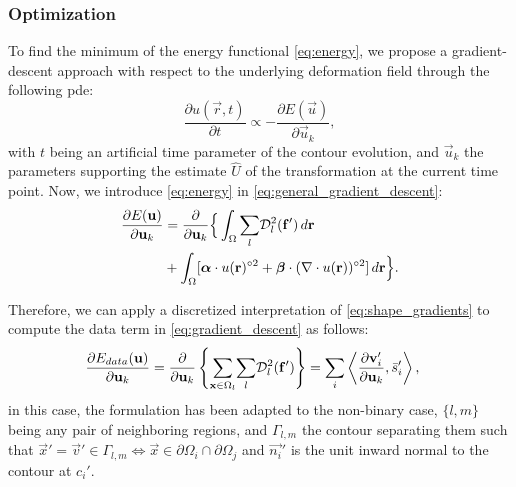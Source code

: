 \subsubsection{Optimization}
\label{sec:gradient_descent}
To find the minimum of the energy functional \eqref{eq:energy},
  we propose a gradient-descent approach with respect to the underlying
  deformation field through the following \gls*{pde}:
  \begin{equation}
  \frac{\partial u(\vec{r},t)}{\partial t} \propto - \frac{\partial E(\vec{u})}{\partial \vec{u}_k},
  \label{eq:general_gradient_descent}
  \end{equation}
  with $t$ being an artificial time parameter of the contour
  evolution, and $\vec{u}_k$ the parameters supporting the estimate
  $\hat{U}$ of the transformation at the current time point.
Now, we introduce \eqref{eq:energy} in \eqref{eq:general_gradient_descent}:
  \begin{align}
  \frac{\partial E(\vec{u})}{\partial \vec{u}_k} &=
  \frac{ \partial }{\partial \vec{u}_k} \Big\{
  \int_{\Omega} \underset{l}{\sum} \mdist{f'}{l} \,d\vec{r} \notag\\
  &+ \int_{\Omega} [ \boldsymbol{\alpha} \cdot u(\vec{r})^{\circ2}
  + \boldsymbol{\beta} \cdot (\nabla \cdot u(\vec{r}))^{\circ2} ] \,d\vec{r}
  \Big\}.
  \label{eq:gradient_descent}
  \end{align}

Therefore, we can apply a discretized interpretation of \eqref{eq:shape_gradients}
  to compute the data term in \eqref{eq:gradient_descent} as follows:
  \begin{align}
  \frac{\partial E_{data}(\vec{u})}{\partial \vec{u}_k} &=
  \frac{ \partial }{\partial \vec{u}_k} \left\{
   \underset{\vec{x} \in \Omega_l}{\sum} \underset{l}{\sum} \mdist{f'}{l} \right\}
  = \underset{i}{\sum}
   \left\langle \frac{\partial \vec{v}_i'}{\partial \vec{u}_k}, \bar{s}_i'\right\rangle,
  \label{eq:gradient_wshape}
  \end{align}
  in this case, the formulation has been adapted to the non-binary case, $\{l,m\}$
  being any pair of neighboring regions, and $\Gamma_{l,m}$ the contour separating
  them such that $\vec{x}' = \vec{v}' \in\Gamma_{l,m} \iff \vec{x}\in \partial\Omega_i \cap \partial\Omega_j$
  and $\vec{n_i}'$ is the unit inward normal to the contour at $c_i'$.

